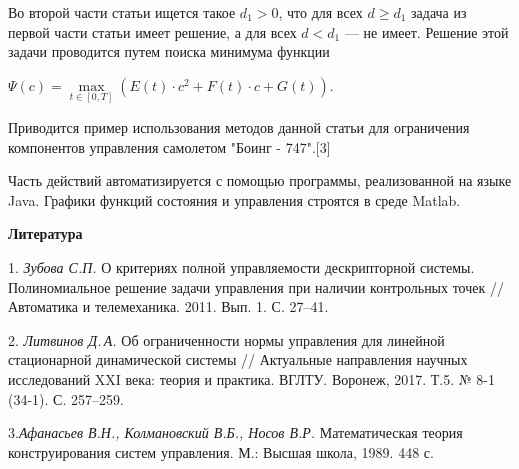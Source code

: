 Во второй части статьи ищется такое $d_{1}>0$, что для всех $d\geq d_{1}$ задача из первой части статьи имеет решение, а для всех $d<d_{1}$ --- не имеет. Решение этой задачи проводится путем поиска минимума функции

$\Psi (c)=\max\limits_{t\in[0,T]}(E(t)\cdot c^{2}+F(t)\cdot c+G(t))$.

Приводится пример использования методов данной статьи для ограничения  компонентов управления самолетом "Боинг - 747".[3]

Часть действий автоматизируется с помощью программы, реализованной на языке Java.
Графики функций состояния и уп\-ра\-в\-ле\-ния строятся в среде Matlab.

\smallskip \centerline{\bf Литература}\nopagebreak

1. \textit{Зубова С.П.} О критериях полной управляемости дескрипторной системы. Полиномиальное решение задачи управления при наличии контрольных точек // Автоматика и телемеханика. 2011. Вып. 1. С. 27--41.

2. \textit{Литвинов Д.\,А.}
Об ограниченности нормы управления для линейной стационарной динамической системы
//
Актуальные направления научных исследований XXI века: теория и практика. ВГЛТУ. Воронеж, 2017. Т.5. № 8-1 (34-1). С. 257--259.

3.\textit{Афанасьев В.Н., Колмановский В.Б., Носов В.Р. } Математическая теория конструирования систем управления. М.: Высшая школа, 1989. 448 с.

